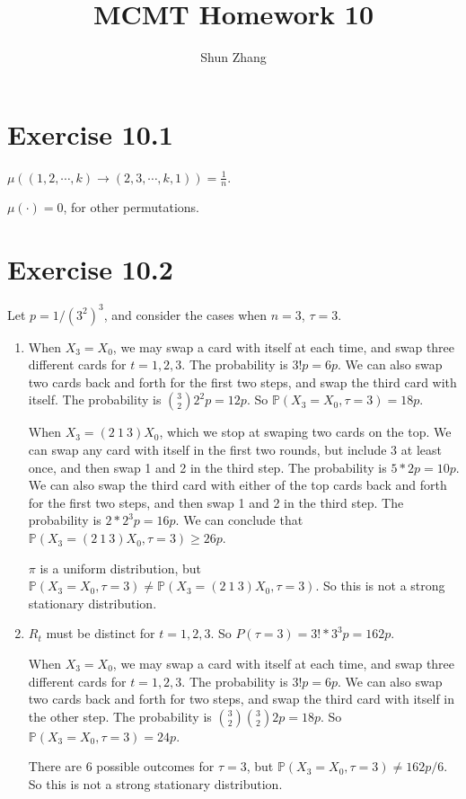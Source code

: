 \documentclass[10pt]{article}
\title{MCMT Homework 10}
\author{Shun Zhang}
\date{}
\renewcommand{\P}{\mathbb{P}}
\begin{document}
\maketitle

\section*{Exercise 10.1}

$\mu((1, 2, \cdots, k) \rightarrow (2, 3, \cdots, k, 1)) = \frac{1}{n}$.

$\mu(\cdot) = 0$, for other permutations.

\section*{Exercise 10.2}

Let $p = 1 / (3^2)^3$, and consider the cases when $n = 3$, $\tau = 3$.

\begin{enumerate}
\item 
When $X_3 = X_0$, we may swap a card with itself at each time, and swap three
different cards for $t = 1, 2, 3$. The probability is $3!p = 6p$. We can also swap
two cards back and forth for the first two steps, and swap the third card with
itself. The probability is ${3 \choose 2} 2^2p = 12p$. So $\P(X_3 = X_0, \tau = 3)
= 18p$.

When $X_3 = (2\ 1\ 3)X_0$, which we stop at swaping two cards on the top. We can
swap any card with itself in the first two rounds, but include 3 at least once,
and then swap 1 and 2 in the third step. The probability is $5 * 2p = 10p$.
We can also swap the third card with either of the top cards back and forth for
the first two steps, and then swap 1 and 2 in the third step. The probability is
$2 * 2^3p = 16p$. We can conclude that $\P(X_3 = (2\ 1\ 3)X_0, \tau = 3) \geq
26p$.

$\pi$ is a uniform distribution, but $\P(X_3 = X_0, \tau = 3) \neq \P(X_3 = (2\
1\ 3)X_0, \tau = 3)$. So this is not a strong stationary distribution.

\item 
$R_t$ must be distinct for $t = 1, 2, 3$. So $P(\tau = 3) = 3! * 3^3p = 162p$.

When $X_3 = X_0$, we may swap a card with itself at each time, and swap three
different cards for $t = 1, 2, 3$. The probability is $3!p = 6p$. We can also
swap two cards back and forth for two steps, and swap the third card with itself
in the other step. The probability is ${3 \choose 2} {3 \choose 2} 2p = 18p$. So $\P(X_3 = X_0,
\tau = 3)
= 24p$.

There are 6 possible outcomes for $\tau = 3$, but $\P(X_3 = X_0, \tau = 3) \neq
162p / 6$. So this is not a strong stationary distribution.

\end{enumerate}
\end{document}
